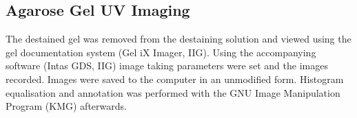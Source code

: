 \subsection{Agarose Gel UV Imaging}
The destained gel was removed from the destaining solution and viewed using the gel documentation system (Gel iX Imager, IIG). Using the accompanying software (Intas GDS, IIG) image taking parameters were set and the images recorded. Images were saved to the computer in an unmodified form. Histogram equalisation and annotation was performed with the GNU Image Manipulation Program (KMG) afterwards.

